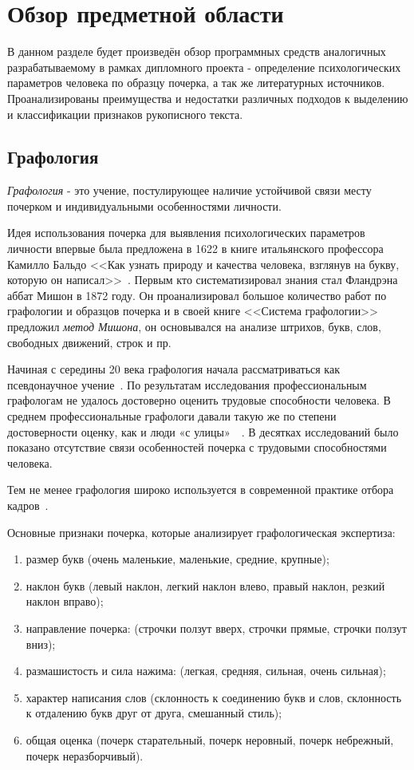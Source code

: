 \section{Обзор предметной области}
\label{sec:domain:intro}

В данном разделе будет произведён обзор программных средств аналогичных разрабатываемому в рамках дипломного проекта - определение психологических параметров человека по образцу почерка, а так же литературных источников. Проанализированы преимущества и недостатки различных подходов к выделению и классификации признаков рукописного текста.

\subsection{Графология}
\label{sub:domain:grafologic}
\emph{Графология} - это учение, постулирующее наличие устойчивой связи месту почерком и индивидуальными особенностями личности.

Идея использования почерка для выявления психологических параметров личности впервые была предложена в 1622 в книге итальянского профессора Камилло Бальдо <<Как узнать природу и качества человека, взглянув на букву, которую он написал>>~\cite{kamillo_grafology}. Первым кто систематизировал знания стал Фландрэна аббат Мишон в 1872 году. Он проанализировал большое количество работ по графологии и образцов почерка и в своей книге <<Система графологии>> предложил \emph{метод Мишона}, он основывался на анализе штрихов, букв, слов, свободных движений, строк и пр.~\cite{mishon_grafology}

Начиная с середины 20 века графология начала рассматриваться как псевдонаучное учение~\cite{graphology_wiki}. По результатам исследования профессиональным графологам не удалось достоверно оценить трудовые способности человека. В среднем профессиональные графологи давали такую же по степени достоверности оценку, как и люди «с улицы»~\cite{neter_shakhar_psevdograph}~\cite{king_koehler_psevdograph}. В десятках исследований было показано отсутствие связи особенностей почерка с трудовыми способностями человека.

Тем не менее графология широко используется в современной практике отбора кадров~\cite{graphology_psyfactor}.

Основные признаки почерка, которые анализирует графологическая экспертиза:
\begin{enumerate}
  \item размер букв (очень маленькие, маленькие, средние, крупные);
  \item наклон букв (левый наклон, легкий наклон влево, правый наклон, резкий наклон вправо);
  \item направление почерка: (строчки ползут вверх, строчки прямые,  строчки ползут вниз);
  \item размашистость и сила нажима: (легкая, средняя, сильная, очень сильная);
  \item характер написания слов (склонность к соединению букв и слов, склонность к отдалению букв друг от друга, смешанный стиль);
  \item общая оценка (почерк старательный, почерк неровный, почерк небрежный, почерк неразборчивый).
\end{enumerate}

